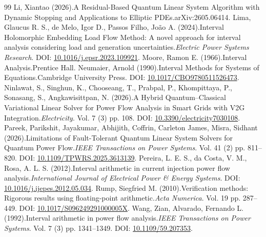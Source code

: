 \begin{thebibliography}{99}
Li, Xiantao (2026).\newblock A Residual-Based Quantum Linear System Algorithm with Dynamic Stopping and Applications to Elliptic PDEs.\newblock arXiv:2605.06414. 
Lima, Glaucus R. S., de Melo, Igor D., Passos Filho, Jo\~ao A. (2024).\newblock Interval Holomorphic Embedding Load Flow Method: A novel approach for interval analysis considering load and generation uncertainties.\newblock \emph{Electric Power Systems Research}. DOI: \href{https://doi.org/10.1016/j.epsr.2023.109921}{10.1016/j.epsr.2023.109921}. 
Moore, Ramon E. (1966).\newblock Interval Analysis.\newblock Prentice Hall. 
Neumaier, Arnold (1990).\newblock Interval Methods for Systems of Equations.\newblock Cambridge University Press. DOI: \href{https://doi.org/10.1017/CBO9780511526473}{10.1017/CBO9780511526473}. 
Ninlawat, S., Singhun, K., Chooseang, T., Prabpal, P., Khompittaya, P., Sonasang, S., Angkawisittpan, N. (2026).\newblock A Hybrid Quantum--Classical Variational Linear Solver for Power Flow Analysis in Smart Grids with V2G Integration.\newblock \emph{Electricity}. Vol. 7 (3) pp. 108. DOI: \href{https://doi.org/10.3390/electricity7030108}{10.3390/electricity7030108}. 
Pareek, Parikshit, Jayakumar, Abhijith, Coffrin, Carleton James, Misra, Sidhant (2026).\newblock Limitations of Fault-Tolerant Quantum Linear System Solvers for Quantum Power Flow.\newblock \emph{IEEE Transactions on Power Systems}. Vol. 41 (2) pp. 811--820. DOI: \href{https://doi.org/10.1109/TPWRS.2025.3613139}{10.1109/TPWRS.2025.3613139}. 
Pereira, L. E. S., da Costa, V. M., Rosa, A. L. S. (2012).\newblock Interval arithmetic in current injection power flow analysis.\newblock \emph{International Journal of Electrical Power \& Energy Systems}. DOI: \href{https://doi.org/10.1016/j.ijepes.2012.05.034}{10.1016/j.ijepes.2012.05.034}. 
Rump, Siegfried M. (2010).\newblock Verification methods: Rigorous results using floating-point arithmetic.\newblock \emph{Acta Numerica}. Vol. 19 pp. 287--449. DOI: \href{https://doi.org/10.1017/S096249291000005X}{10.1017/S096249291000005X}. 
Wang, Zian, Alvarado, Fernando L. (1992).\newblock Interval arithmetic in power flow analysis.\newblock \emph{IEEE Transactions on Power Systems}. Vol. 7 (3) pp. 1341--1349. DOI: \href{https://doi.org/10.1109/59.207353}{10.1109/59.207353}. 

\end{thebibliography}
